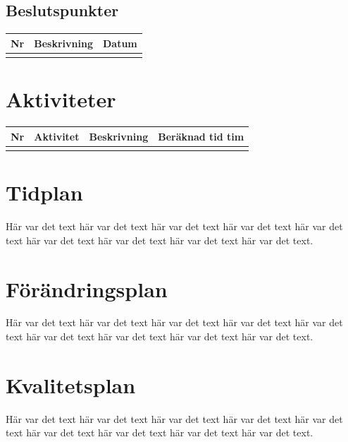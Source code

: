 \documentclass[a4paper,titlepage,12pt]{article}
\newcounter{bpNr}
\newcommand{\nextBPNr}{\stepcounter{bpNr}\arabic{bpNr}}
\newcounter{aktNr}
\newcommand{\nextAktNr}{\stepcounter{aktNr}\arabic{aktNr}}
\begin{document}
	
	\subsection{Beslutspunkter}
	\begin{table}[h]
		\begin{center}
			\begin{tabular}[pos]{ l l l }
				\textbf{Nr} & \textbf{Beskrivning} & \textbf{Datum} \\ \midrule
				\nextBPNr{} & & \\ \midrule
			\end{tabular}
		\end{center}
	\end{table}
	
	
	\section{Aktiviteter}
	\begin{table}[h]
		\begin{center}
			\begin{tabular}[pos]{ l l l l }
				\textbf{Nr} & \textbf{Aktivitet} & \textbf{Beskrivning} & \textbf{Beräknad tid tim} \\ \midrule
				\nextAktNr{} & & & \\ \midrule
			\end{tabular}
		\end{center}
	\end{table}

	
	\section{Tidplan}
	Här var det text här var det text här var det text
	här var det text här var det text här var det text
	här var det text här var det text här var det text.
	
	
	\section{Förändringsplan}
	Här var det text här var det text här var det text
	här var det text här var det text här var det text
	här var det text här var det text här var det text.
	
	
	\section{Kvalitetsplan}
	Här var det text här var det text här var det text
	här var det text här var det text här var det text
	här var det text här var det text här var det text.
	
\end{document}
